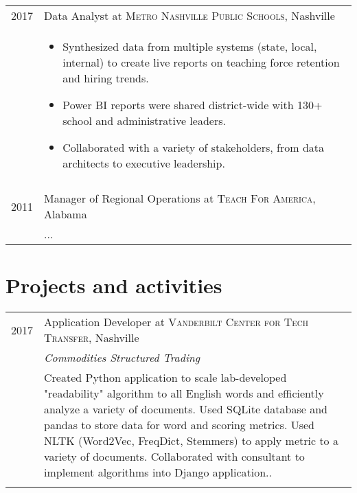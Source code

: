 \documentclass[a4paper,10pt]{article}
\begin{document}
\begin{tabular}{r|p{11cm}}
    \textsc{2017} & Data Analyst at \textsc{Metro Nashville Public Schools}, Nashville \\
    &\footnotesize{
    \begin{itemize}[topsep=0pt]
        \item Synthesized data from multiple systems (state, local, internal) to create live reports on teaching force retention and hiring trends. 
        \item Power BI reports were shared district-wide with 130+ school and administrative leaders. 
        \item Collaborated with a variety of stakeholders, from data architects to executive leadership.
    \end{itemize}} \\
    \multicolumn{2}{c}{} \\

    \textsc{2011} & Manager of Regional Operations at \textsc{Teach For America}, Alabama \\
    &\footnotesize{...} \\

\end{tabular}




\section{Projects and activities}
\begin{tabular}{rl}
    \textsc{2017} & Application Developer at \textsc{Vanderbilt Center for Tech Transfer}, Nashville \\
    &\emph{Commodities Structured Trading}\\
    &\footnotesize{Created Python application to scale lab-developed "readability" algorithm to all English words and efficiently analyze a variety of documents. Used SQLite database and pandas to store data for word and scoring metrics. Used NLTK (Word2Vec, FreqDict, Stemmers) to apply metric to a variety of documents. Collaborated with consultant to implement algorithms into Django application..}\\
    \multicolumn{2}{c}{} \\
\end{tabular}

\end{document}
